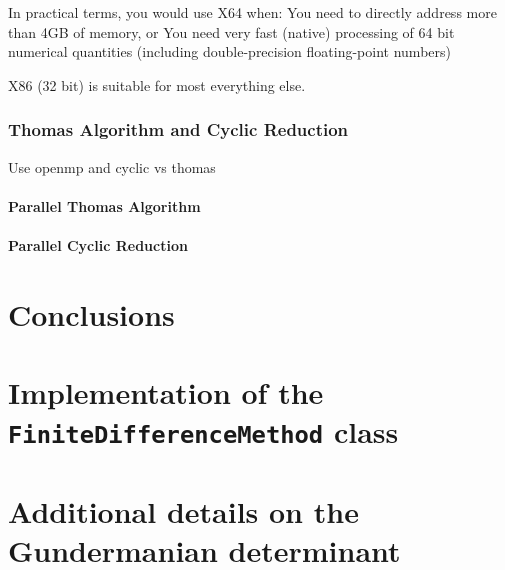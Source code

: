 \documentclass[12pt, oneside]{book}
\theoremstyle{plain}
\theoremstyle{definition}
\begin{document}
In practical terms, you would use X64 when:  You need to directly address more than 4GB of memory, or
    You need very fast (native) processing of 64 bit numerical quantities (including double-precision floating-point numbers)

X86 (32 bit) is suitable for most everything else.

\subsection{Thomas Algorithm and Cyclic Reduction}
Use openmp and cyclic vs thomas
\subsubsection{Parallel Thomas Algorithm}
\subsubsection{Parallel Cyclic Reduction}


\chapter{Conclusions}


\appendix
\chapter{Implementation of the {\tt FiniteDifferenceMethod} class}
\lipsum[10]
\chapter[shorter running title]{Additional details on the Gundermanian determinant}
\lipsum[10]


    



\end{document}
